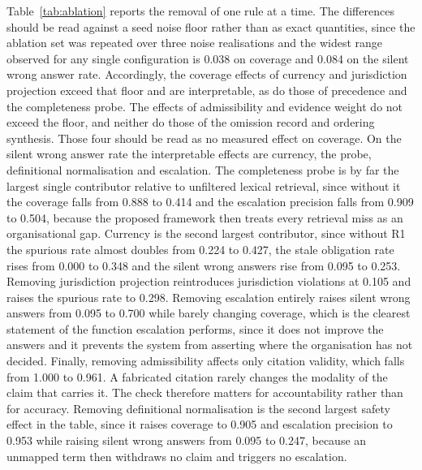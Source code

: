 \documentclass[journal]{IEEEtran}
\begin{document}
Table~\ref{tab:ablation} reports the removal of one rule at a time. The differences should be read against a seed noise floor rather than as exact quantities, since the ablation set was repeated over three noise realisations and the widest range observed for any single configuration is 0.038 on coverage and 0.084 on the silent wrong answer rate. Accordingly, the coverage effects of currency and jurisdiction projection exceed that floor and are interpretable, as do those of precedence and the completeness probe. The effects of admissibility and evidence weight do not exceed the floor, and neither do those of the omission record and ordering synthesis. Those four should be read as no measured effect on coverage. On the silent wrong answer rate the interpretable effects are currency, the probe, definitional normalisation and escalation. The completeness probe is by far the largest single contributor relative to unfiltered lexical retrieval, since without it the coverage falls from 0.888 to 0.414 and the escalation precision falls from 0.909 to 0.504, because the proposed framework then treats every retrieval miss as an organisational gap. Currency is the second largest contributor, since without R1 the spurious rate almost doubles from 0.224 to 0.427, the stale obligation rate rises from 0.000 to 0.348 and the silent wrong answers rise from 0.095 to 0.253. Removing jurisdiction projection reintroduces jurisdiction violations at 0.105 and raises the spurious rate to 0.298. Removing escalation entirely raises silent wrong answers from 0.095 to 0.700 while barely changing coverage, which is the clearest statement of the function escalation performs, since it does not improve the answers and it prevents the system from asserting where the organisation has not decided. Finally, removing admissibility affects only citation validity, which falls from 1.000 to 0.961. A fabricated citation rarely changes the modality of the claim that carries it. The check therefore matters for accountability rather than for accuracy. Removing definitional normalisation is the second largest safety effect in the table, since it raises coverage to 0.905 and escalation precision to 0.953 while raising silent wrong answers from 0.095 to 0.247, because an unmapped term then withdraws no claim and triggers no escalation.
\end{document}
